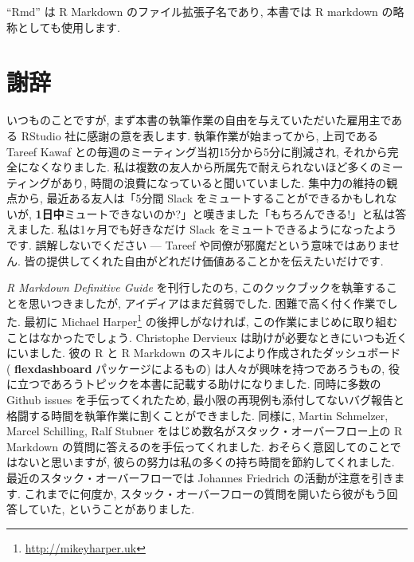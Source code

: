 \documentclass[
  11pt,
  lualatex,ja=standard,jafont=noto]{bxjsreport}
\renewcommand{\href}[2]{#2\footnote{\url{#1}}}
\begin{document}
``Rmd'' は R Markdown のファイル拡張子名であり, 本書では R markdown の略称としても使用します.

\hypertarget{acknowledgments}{%
\section*{謝辞}\label{acknowledgments}}

いつものことですが, まず本書の執筆作業の自由を与えていただいた雇用主である RStudio 社に感謝の意を表します. 執筆作業が始まってから, 上司である Tareef Kawaf との毎週のミーティング当初15分から5分に削減され, それから完全になくなりました. 私は複数の友人から所属先で耐えられないほど多くのミーティングがあり, 時間の浪費になっていると聞いていました. 集中力の維持の観点から, 最近ある友人は「5分間 Slack をミュートすることができるかもしれないが, \textbf{1日中}ミュートできないのか?」と嘆きました「もちろんできる!」と私は答えました. 私は1ヶ月でも好きなだけ Slack をミュートできるようになったようです. 誤解しないでください --- Tareef や同僚が邪魔だという意味ではありません. 皆の提供してくれた自由がどれだけ価値あることかを伝えたいだけです.

\emph{R Markdown Definitive Guide} を刊行したのち, このクックブックを執筆することを思いつきましたが, アイディアはまだ貧弱でした. 困難で高く付く作業でした. 最初に \href{http://mikeyharper.uk}{Michael Harper} の後押しがなければ, この作業にまじめに取り組むことはなかったでしょう. Christophe Dervieux は助けが必要なときにいつも近くにいました. 彼の R と R Markdown のスキルにより作成されたダッシュボード ( \textbf{flexdashboard} パッケージによるもの) は人々が興味を持つであろうもの, 役に立つであろうトピックを本書に記載する助けになりました. 同時に多数の Github issues を手伝ってくれたため, 最小限の再現例も添付してないバグ報告と格闘する時間を執筆作業に割くことができました. 同様に, Martin Schmelzer, Marcel Schilling, Ralf Stubner をはじめ数名がスタック・オーバーフロー上の R Markdown の質問に答えるのを手伝ってくれました. おそらく意図してのことではないと思いますが, 彼らの努力は私の多くの持ち時間を節約してくれました. 最近のスタック・オーバーフローでは Johannes Friedrich の活動が注意を引きます. これまでに何度か, スタック・オーバーフローの質問を開いたら彼がもう回答していた, ということがありました.
\end{document}
